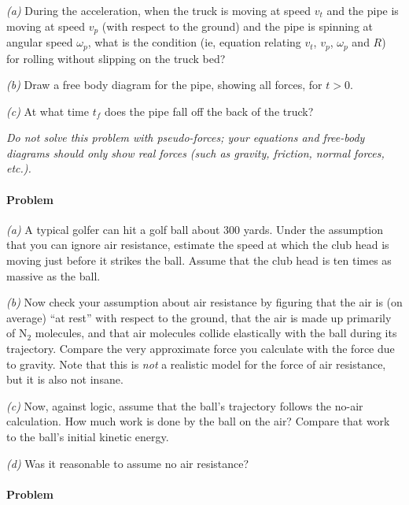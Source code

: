 \documentclass[12pt]{article}
\newcounter{problem}
\begin{document}
\textsl{(a)} During the acceleration, when the truck is moving at
speed $v_t$ and the pipe is moving at speed $v_p$ (with respect to the
ground) and the pipe is spinning at angular speed $\omega_p$, what is
the condition (ie, equation relating $v_t$, $v_p$, $\omega_p$ and $R$)
for rolling without slipping on the truck bed?

\textsl{(b)} Draw a free body diagram for the pipe, showing all
forces, for $t>0$.

\textsl{(c)} At what time $t_f$ does the pipe fall off the back of the
truck?

\emph{Do not solve this problem with pseudo-forces; your equations and
free-body diagrams should only show real forces (such as gravity,
friction, normal forces, etc.).}

\paragraph{Problem~\theproblem}

\textsl{(a)} A typical golfer can hit a golf ball about 300 yards.
Under the assumption that you can ignore air resistance, estimate the
speed at which the club head is moving just before it strikes the
ball.  Assume that the club head is ten times as massive as the ball.

\textsl{(b)} Now check your assumption about air resistance by
figuring that the air is (on average) ``at rest'' with respect to the
ground, that the air is made up primarily of $\mathrm{N}_2$ molecules,
and that air molecules collide elastically with the ball during its
trajectory.  Compare the very approximate force you calculate with the
force due to gravity.  Note that this is \emph{not} a realistic model
for the force of air resistance, but it is also not insane.

\textsl{(c)} Now, against logic, assume that the ball's trajectory
follows the no-air calculation.  How much work is done by the ball on
the air?  Compare that work to the ball's initial kinetic energy.

\textsl{(d)} Was it reasonable to assume no air resistance?

\paragraph{Problem~\theproblem}
\end{document}
